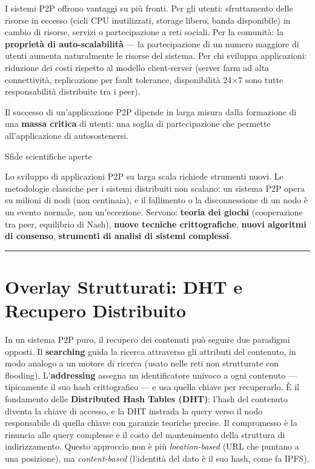 \documentclass[
  italian,
  openany]{book}
\begin{document}
I sistemi P2P offrono vantaggi su più fronti. Per gli utenti:
sfruttamento delle risorse in eccesso (cicli CPU inutilizzati, storage
libero, banda disponibile) in cambio di risorse, servizi o
partecipazione a reti sociali. Per la comunità: la \textbf{proprietà di
auto-scalabilità} --- la partecipazione di un numero maggiore di utenti
aumenta naturalmente le risorse del sistema. Per chi sviluppa
applicazioni: riduzione dei costi rispetto al modello client-server
(server farm ad alta connettività, replicazione per fault tolerance,
disponibilità 24×7 sono tutte responsabilità distribuite tra i peer).

Il successo di un'applicazione P2P dipende in larga misura dalla
formazione di una \textbf{massa critica} di utenti: una soglia di
partecipazione che permette all'applicazione di autosostenersi.

\begin{calloutnote}{Sfide scientifiche aperte}

Lo sviluppo di applicazioni P2P su larga scala richiede strumenti nuovi.
Le metodologie classiche per i sistemi distribuiti non scalano: un
sistema P2P opera su milioni di nodi (non centinaia), e il fallimento o
la disconnessione di un nodo è un evento normale, non un'eccezione.
Servono: \textbf{teoria dei giochi} (cooperazione tra peer, equilibrio
di Nash), \textbf{nuove tecniche crittografiche}, \textbf{nuovi
algoritmi di consenso}, \textbf{strumenti di analisi di sistemi
complessi}.

\end{calloutnote}

\begin{center}\rule{0.5\linewidth}{0.5pt}\end{center}

\section{Overlay Strutturati: DHT e Recupero
Distribuito}\label{overlay-strutturati-dht-e-recupero-distribuito}

In un sistema P2P puro, il recupero dei contenuti può seguire due
paradigmi opposti. Il \textbf{searching} guida la ricerca attraverso gli
attributi del contenuto, in modo analogo a un motore di ricerca (usato
nelle reti non strutturate con flooding). L'\textbf{addressing} assegna
un identificatore univoco a ogni contenuto --- tipicamente il suo hash
crittografico --- e usa quella chiave per recuperarlo. È il fondamento
delle \textbf{Distributed Hash Tables (DHT)}: l'hash del contenuto
diventa la chiave di accesso, e la DHT instrada la query verso il nodo
responsabile di quella chiave con garanzie teoriche precise. Il
compromesso è la rinuncia alle query complesse e il costo del
mantenimento della struttura di indirizzamento. Questo approccio non è
più \emph{location-based} (URL che puntano a una posizione), ma
\emph{content-based} (l'identità del dato è il suo hash, come fa IPFS).
\end{document}
